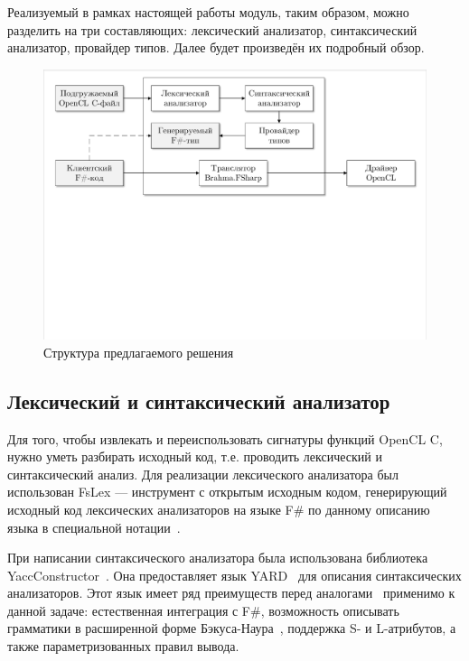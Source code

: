 Реализуемый в рамках настоящей работы модуль, таким образом, можно разделить на три составляющих: лексический анализатор, синтаксический анализатор, провайдер типов. Далее будет произведён их подробный обзор.

\begin{figure}[h]
\centering
\includegraphics[width=\textwidth]{Smirenko/courseworkpictures/architecture.pdf}
\caption{Структура предлагаемого решения}
\label{architecture}
\end{figure}

\subsection{Лексический и синтаксический анализатор}
Для того, чтобы извлекать и переиспользовать сигнатуры функций OpenCL C, нужно уметь разбирать исходный код, т.е. проводить лексический и синтаксический анализ. Для реализации лексического анализатора был использован FsLex --- инструмент с открытым исходным кодом, генерирующий исходный код лексических анализаторов на языке F\# по данному описанию языка в специальной нотации~\cite{FsLex}.

При написании синтаксического анализатора была использована библиотека YaccConstructor~\cite{YaccConstructorPaper, YaccConstructorPage}. Она предоставляет язык YARD~\cite{YARD} для описания синтаксических анализаторов. Этот язык имеет ряд преимуществ перед аналогами~\cite{ANTLR, Yacc} применимо к данной задаче: естественная интеграция с F\#, возможность описывать грамматики в расширенной форме Бэкуса-Наура~\cite{EBNF}, поддержка S- и L-атрибутов, а также параметризованных правил вывода.

